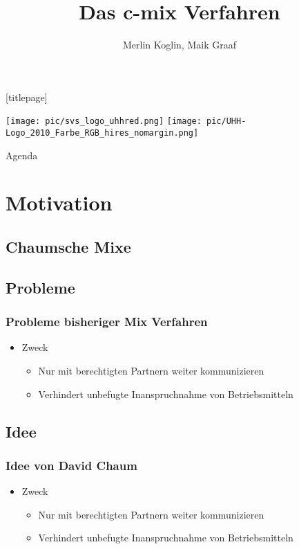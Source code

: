 \documentclass[t, xcolor=dvipsnames]{beamer}
\title{Das c-mix Verfahren }
\author[Merlin Koglin, Maik Graaf]{Merlin Koglin, Maik Graaf}
\date{}
\begin{document}
\begingroup
	[titlepage]
	\begin{frame}[plain]
		\vskip8mm
		\texttt{[image: pic/svs\_logo\_uhhred.png]}
		\titlepage
		\vspace{\fill}
		\texttt{[image: pic/UHH-Logo\_2010\_Farbe\_RGB\_hires\_nomargin.png]}
		\vskip20pt
	\end{frame}
\endgroup

\begin{frame}{Agenda}
	\tableofcontents
\end{frame}

\section{Motivation} %

\subsection{Chaumsche Mixe} %
\subsection{Probleme} %
\begin{frame}
	\frametitle{Probleme bisheriger Mix Verfahren}
	\begin{itemize}
		\item Zweck
			\begin{itemize}
				\item Nur mit \alert{berechtigten Partnern} weiter kommunizieren
				\item Verhindert unbefugte Inanspruchnahme von Betriebsmitteln
			\end{itemize}
	\end{itemize}
	\vspace{\fill}
\end{frame}
\subsection{Idee} %
\begin{frame}
	\frametitle{Idee von David Chaum}
	\begin{itemize}
		\item Zweck
			\begin{itemize}
				\item Nur mit \alert{berechtigten Partnern} weiter kommunizieren
				\item Verhindert unbefugte Inanspruchnahme von Betriebsmitteln
			\end{itemize}
	\end{itemize}
	\vspace{\fill}
\end{frame}
\end{document}
